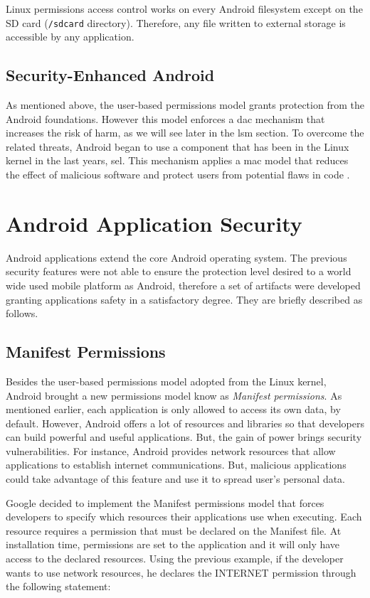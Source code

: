 Linux permissions access control works on every Android filesystem except on the SD card (\texttt{/sdcard} directory). Therefore, any file written to external storage is accessible by any application.

\subsection{Security-Enhanced Android}

As mentioned above, the user-based permissions model grants protection from the Android foundations. However this model enforces a \gls{dac} mechanism that increases the risk of harm, as we will see later in the \gls{lsm} section. To overcome the related threats, Android began to use a component that has been in the Linux kernel in the last years, \gls{sel}. This mechanism applies a \gls{mac} model \cite{SEAndroid} that reduces the effect of malicious software and protect users from potential flaws in code \cite{SELinux:Android}. 

\section{Android Application Security}

Android applications extend the core Android operating system. The previous security features were not able to ensure the protection level desired to a world wide used mobile platform as Android, therefore a set of artifacts were developed granting applications safety in a satisfactory degree. They are briefly described as follows.

\subsection{Manifest Permissions}

Besides the user-based permissions model adopted from the Linux kernel, Android brought a new permissions model know as \textit{Manifest permissions}. As mentioned earlier, each application is only allowed to access its own data, by default. However, Android offers a lot of resources and libraries so that developers can build powerful and useful applications. But, the gain of power brings security vulnerabilities. For instance, Android provides network resources that allow applications to establish internet communications. But, malicious applications could take advantage of this feature and use it to spread user's personal data.


Google decided to implement the Manifest permissions model that forces developers to specify which resources their applications use when executing. Each resource requires a permission that must be declared on the Manifest file. At installation time, permissions are set to the application and it will only have access to the declared resources. Using the previous example, if the developer wants to use network resources, he declares the INTERNET permission through the following statement:

